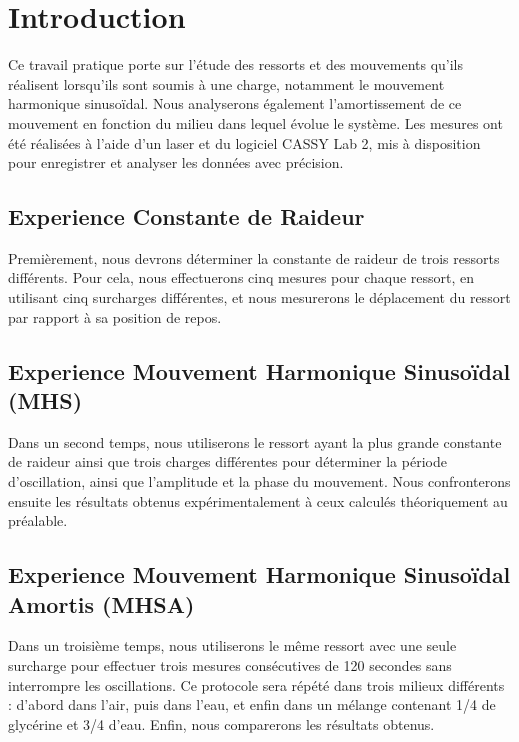 \section{Introduction}
    Ce travail pratique porte sur l'étude des ressorts et des mouvements qu'ils réalisent 
    lorsqu'ils sont soumis à une charge, notamment le mouvement harmonique sinusoïdal.
    Nous analyserons également l'amortissement de ce mouvement en fonction du milieu dans 
    lequel évolue le système.  Les mesures ont été réalisées à l'aide d'un laser et du logiciel 
    CASSY Lab 2, mis à disposition pour enregistrer et analyser les données avec précision.
    
    \subsection{Experience Constante de Raideur}
    Premièrement, nous devrons déterminer la constante de raideur de trois ressorts différents. 
    Pour cela, nous effectuerons cinq mesures pour chaque ressort, en utilisant cinq surcharges 
    différentes, et nous mesurerons le déplacement du ressort par rapport à sa position de repos.

    \subsection{Experience Mouvement Harmonique Sinusoïdal (MHS)}
    Dans un second temps, nous utiliserons le ressort ayant la plus grande constante de raideur 
    ainsi que trois charges différentes pour déterminer la période d'oscillation, ainsi que l'amplitude 
    et la phase du mouvement. Nous confronterons ensuite les résultats obtenus expérimentalement à ceux 
    calculés théoriquement au préalable.

    \subsection{Experience Mouvement Harmonique Sinusoïdal Amortis (MHSA)}
    Dans un troisième temps, nous utiliserons le même ressort avec une seule surcharge pour effectuer trois 
    mesures consécutives de 120 secondes sans interrompre les oscillations. Ce protocole sera répété dans 
    trois milieux différents : d'abord dans l'air, puis dans l'eau, et enfin dans un mélange contenant 1/4 de 
    glycérine et 3/4 d'eau. Enfin, nous comparerons les résultats obtenus.
